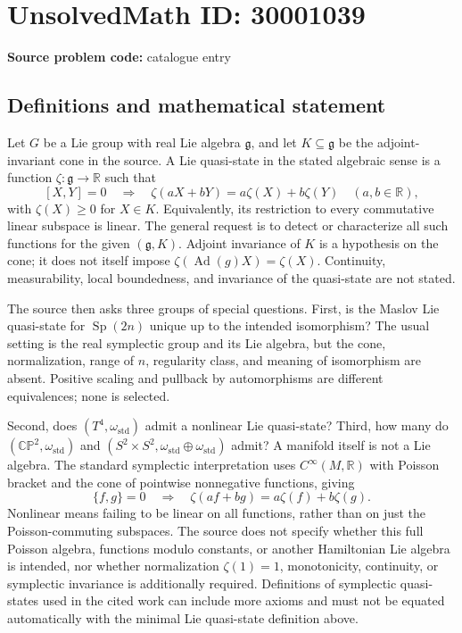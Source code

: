 \documentclass[11pt]{article}
\newcommand{\R}{\mathbb{R}}
\begin{document}
\section*{UnsolvedMath ID: 30001039}
\textbf{Source problem code:} catalogue entry
\subsection{Definitions and mathematical statement}
Let \(G\) be a Lie group with real Lie algebra \(\mathfrak g\), and let \(K\subseteq\mathfrak g\) be the adjoint-invariant cone in the source. A Lie quasi-state in the stated algebraic sense is a function \(\zeta:\mathfrak g\to\R\) such that
\[
 [X,Y]=0\quad\Longrightarrow\quad
 \zeta(aX+bY)=a\zeta(X)+b\zeta(Y)
 \quad(a,b\in\R),
\]
with \(\zeta(X)\geq0\) for \(X\in K\). Equivalently, its restriction to every commutative linear subspace is linear. The general request is to detect or characterize all such functions for the given \((\mathfrak g,K)\). Adjoint invariance of \(K\) is a hypothesis on the cone; it does not itself impose \(\zeta(\operatorname{Ad}(g)X)=\zeta(X)\). Continuity, measurability, local boundedness, and invariance of the quasi-state are not stated.

The source then asks three groups of special questions. First, is the Maslov Lie quasi-state for \(\operatorname{Sp}(2n)\) unique up to the intended isomorphism? The usual setting is the real symplectic group and its Lie algebra, but the cone, normalization, range of \(n\), regularity class, and meaning of isomorphism are absent. Positive scaling and pullback by automorphisms are different equivalences; none is selected.

Second, does \((T^4,\omega_{\mathrm{std}})\) admit a nonlinear Lie quasi-state? Third, how many do \((\mathbb{CP}^2,\omega_{\mathrm{std}})\) and \((S^2\times S^2,\omega_{\mathrm{std}}\oplus\omega_{\mathrm{std}})\) admit? A manifold itself is not a Lie algebra. The standard symplectic interpretation uses \(C^\infty(M,\R)\) with Poisson bracket and the cone of pointwise nonnegative functions, giving
\[
 \{f,g\}=0\quad\Longrightarrow\quad
 \zeta(af+bg)=a\zeta(f)+b\zeta(g).
\]
Nonlinear means failing to be linear on all functions, rather than on just the Poisson-commuting subspaces. The source does not specify whether this full Poisson algebra, functions modulo constants, or another Hamiltonian Lie algebra is intended, nor whether normalization \(\zeta(1)=1\), monotonicity, continuity, or symplectic invariance is additionally required. Definitions of symplectic quasi-states used in the cited work can include more axioms and must not be equated automatically with the minimal Lie quasi-state definition above.
\end{document}
